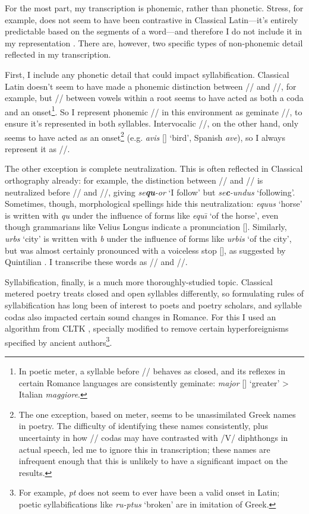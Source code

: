 \documentclass[12pt,twoside]{article}
\newcommand{\ipa}[1]{/\textipa{#1}/}
\newcommand{\ipab}[1]{[\textipa{#1}]}
\begin{document}
For the most part, my transcription is phonemic, rather than phonetic. Stress, for example, does not seem to have been contrastive in Classical Latin---it's entirely predictable based on the segments of a word---and therefore I do not include it in my representation \parencites[83]{allen}[I.5.30]{quintilian}. There are, however, two specific types of non-phonemic detail reflected in my transcription.

First, I include any phonetic detail that could impact syllabification. Classical Latin doesn't seem to have made a phonemic distinction between \ipa{j} and \ipa{jj}, for example, but \ipa{j} between vowels within a root seems to have acted as both a coda and an onset\footnote{In poetic meter, a syllable before \ipa{j} behaves as closed, and its reflexes in certain Romance languages are consistently geminate: \emph{major} \ipab{maj.jor} `greater' > Italian \emph{maggiore}.}. So I represent phonemic \ipa{j} in this environment as geminate \ipa{jj}, to ensure it's represented in both syllables. Intervocalic \ipa{w}, on the other hand, only seems to have acted as an onset\footnote{The one exception, based on meter, seems to be unassimilated Greek names in poetry. The difficulty of identifying these names consistently, plus uncertainty in how \ipa{w} codas may have contrasted with /V/ diphthongs in actual speech, led me to ignore this in transcription; these names are infrequent enough that this is unlikely to have a significant impact on the results.} (e.g. \emph{avis} \ipab{a.wis} `bird', Spanish \emph{ave}), so I always represent it as \ipa{w}.

The other exception is complete neutralization. This is often reflected in Classical orthography already: for example, the distinction between \ipa{k} and \ipa{k\super{w}} is neutralized before \ipa{u} and \ipa{u:}, giving \emph{se\textbf{qu}-or} `I follow' but \emph{se\textbf{c}-undus} `following'. Sometimes, though, morphological spellings hide this neutralization: \emph{equus} `horse' is written with \emph{qu} under the influence of forms like \emph{equ\=\i} `of the horse', even though grammarians like Velius Longus \citep[59.2-8]{longus} indicate a pronunciation \ipab{ekus}. Similarly, \emph{urbs} `city' is written with \emph{b} under the influence of forms like \emph{urbis} `of the city', but was almost certainly pronounced with a voiceless stop \ipab{urps}, as suggested by Quintilian \citep[I.7.7]{quintilian}. I transcribe these words as \ipa{ekus} and \ipa{urps}.

Syllabification, finally, is a much more thoroughly-studied topic. Classical metered poetry treats closed and open syllables differently, so formulating rules of syllabification has long been of interest to poets and poetry scholars, and syllable codas also impacted certain sound changes in Romance. For this I used an algorithm from CLTK \citep{cltk}, specially modified to remove certain hyperforeignisms specified by ancient authors\footnote{For example, \emph{pt} does not seem to ever have been a valid onset in Latin; poetic syllabifications like \emph{ru-ptus} `broken' are in imitation of Greek.}.
\end{document}
